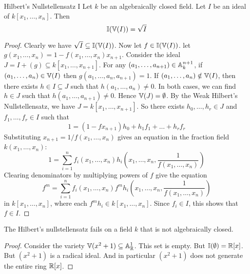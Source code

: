 \documentclass[a4paper]{article}
\begin{document}
\begin{thm}{Hilbert's Nullstellensatz I}{} Let $k$ be an algebraically closed field. Let $I$ be an ideal of $k[x_1,\dots,x_n]$. Then $$\mathbb{I}(\mathbb{V}(I))=\sqrt{I}$$ \tcbline
\begin{proof}
Clearly we have $\sqrt{I}\subseteq\mathbb{I}(\mathbb{V}(I))$. Now let $f\in\mathbb{I}(\mathbb{V}(I))$. let $g(x_1,\dots,x_n)=1-f(x_1,\dots,x_n)x_{n+1}$. Consider the ideal $J=I+(g)\subseteq k[x_1,\dots,x_{n+1}]$. For any $(a_1,\dots,a_{n+1})\in\mathbb{A}_k^{n+1}$, if $(a_1,\dots,a_n)\in\mathbb{V}(I)$ then $g(a_1,\dots,a_n,a_{n+1})=1$. If $(a_1,\dots,a_n)\notin\mathbb{V}(I)$, then there exists $h\in I\subseteq J$ such that $h(a_1,\dots,a_n)\neq 0$. In both cases, we can find $h\in J$ such that $h(a_1,\dots,a_{n+1})\neq 0$. Hence $\mathbb{V}(J)=\emptyset$. By the Weak Hilbert's Nullstellensatz, we have $J=k[x_1,\dots,x_{n+1}]$. So there exists $h_0,\dots,h_r\in J$ and $f_1,\dots,f_r\in I$ such that $$1=(1-fx_{n+1})h_0+h_1f_1+\dots+h_rf_r$$ Substituting $x_{n+1}=1/f(x_1,\dots,x_n)$ gives an equation in the fraction field $k(x_1,\dots,x_n)$: $$1=\sum_{i=1}^nf_i(x_1,\dots,x_n)h_i\left(x_1,\dots,x_n,\frac{1}{f(x_1,\dots,x_n)}\right)$$ Clearing denominators by multiplying powers of $f$ give the equation $$f^m=\sum_{i=1}^nf_i(x_1,\dots,x_n)f^mh_i\left(x_1,\dots,x_n,\frac{1}{f(x_1,\dots,x_n)}\right)$$ in $k[x_1,\dots,x_n]$, where each $f^mh_i\in k[x_1,\dots,x_n]$. Since $f_i\in I$, this shows that $f\in I$. 
\end{proof}
\end{thm}

\begin{eg}{}{} The Hilbert's nullstellensatz fails on a field $k$ that is not algebraically closed. \tcbline
\begin{proof}
Consider the variety $\mathbb{V}(x^2+1)\subseteq\mathbb{A}_{\mathbb{R}}^1$. This set is empty. But $\mathbb{I}(\emptyset)=\mathbb{R}[x]$. But $(x^2+1)$ is a radical ideal. And in particular $(x^2+1)$ does not generate the entire ring $\mathbb{R}[x]$. 
\end{proof}
\end{eg}
\end{document}
